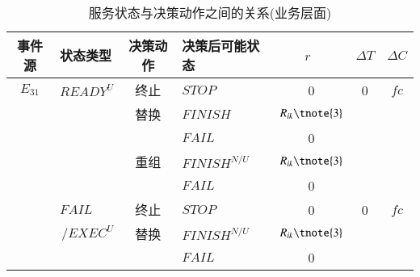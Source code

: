 \begin{table}[htbp]
    \caption{服务状态与决策动作之间的关系(业务层面)}
    \vspace{-0.5em}\label{table:state_action_bp}\centering{}
    \begin{threeparttable}
    \begin{tabular}{clclccc}
        \toprule
        事件源 & 状态类型\tnote{1} & 决策动作 & 决策后可能状态\tnote{1} & $r$~\tnote{2} & {$\Delta T$} & {$\Delta C$} \\
        \midrule

        {$E_{31}$} 
        & {${READY^U}$}
        & {终止}
        & {$STOP$} 
        & {0} 
        & {0} 
        & {$fc$} \\
        
        {}
        & {}
        & {替换} 
        & {$FINISH$} 
        & $R_{ik}\tnote{3}$ 
        & {\multirow{2}{*}{$T_{ik}-T_{i0}$}} 
        & {\multirow{2}{*}{$C_{ik}-C_{i0}$}} \\
        
        {}
        & {}
        & {} 
        & {$FAIL$} 
        & {0}
        & {} 
        & {} \\
        
        {}
        & {}
        & {重组} 
        & {$FINISH^{N/U}$} 
        & $R_{ik}\tnote{3}$ 
        & {\multirow{2}{*}{$\sum\limits_{x = i}^j {({T_{xk}} - {T_{x0}})} $}}
        & {\multirow{2}{*}{$\sum\limits_{x = i}^j {({C_{xk}} - {C_{x0}})} $}} \\
        
        
        {}
        & {}
        & {} 
        & {$FAIL$} 
        & {0}
        & {} 
        & {} \\
        
        {} 
        & {${FAIL}$}
        & {终止}
        & {$STOP$} 
        & {0} 
        & {0} 
        & {$fc$} \\
        
        {}
        & \multicolumn{1}{r}{$/EXEC^U$}
        & {替换} 
        & {${FINISH}^{N/U}$} 
        & $R_{ik}\tnote{3}$ 
        & {\multirow{2}{*}{$T_{ik}$}} 
        & {\multirow{2}{*}{$C_{ik}$}} \\
        
        {}
        & {}
        & {} 
        & {$FAIL$} 
        & {0}
        & {} 
        & {} \\
        

\end{tabular}
\end{threeparttable}
\end{table}
